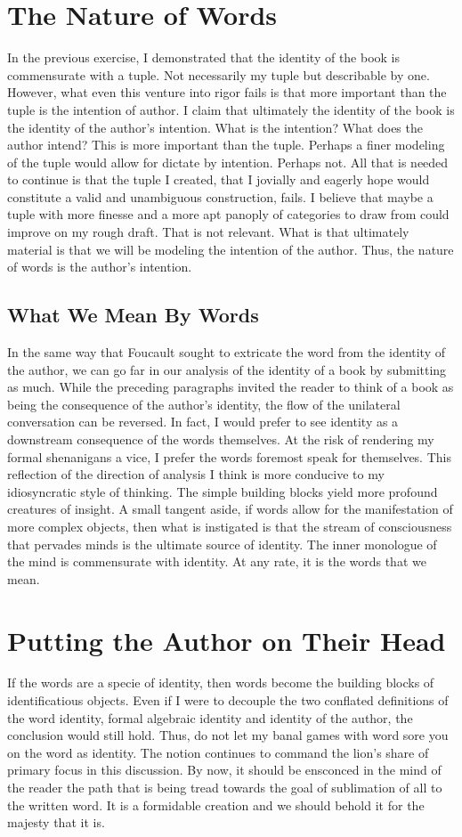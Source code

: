 \documentclass[12pt]{article}
\begin{document}
\section{The Nature of Words}
In the previous exercise, I demonstrated that the identity of the book is
commensurate with a tuple. Not necessarily my tuple but describable by one.
However, what even this venture into rigor fails is that more important than the
tuple is the intention of author. I claim that ultimately the identity of the
book is the identity of the author's intention. What is the intention? What does
the author intend? This is more important than the tuple. Perhaps a finer
modeling of the tuple would allow for dictate by intention. Perhaps not. All
that is needed to continue is that the tuple I created, that I jovially and
eagerly hope would constitute a valid and unambiguous construction, fails. I
believe that maybe a tuple with more finesse and a more apt panoply of
categories to draw from could improve on my rough draft. That is not relevant.
What is that ultimately material is that we will be modeling the intention of
the author. Thus, the nature of words is the author's intention.

\subsection{What We Mean By Words}
In the same way that Foucault sought to extricate the word from the identity of
the author, we can go far in our analysis of the identity of a book by
submitting as much. While the preceding paragraphs invited the reader to think
of a book as being the consequence of the author's identity, the flow of the
unilateral conversation can be reversed. In fact, I would prefer to see identity
as a downstream consequence of the words themselves. At the risk of rendering my
formal shenanigans a vice, I prefer the words foremost speak for themselves.
This reflection of the direction of analysis I think is more conducive to my
idiosyncratic style of thinking. The simple building blocks yield more profound
creatures of insight. A small tangent aside, if words allow for the
manifestation of more complex objects, then what is instigated is that the
stream of consciousness that pervades minds is the ultimate source of identity.
The inner monologue of the mind is commensurate with identity. At any rate, it is
the words that we mean.

\section{Putting the Author on Their Head}
If the words are a specie of identity, then words become the building blocks of
identificatious objects. Even if I were to decouple the two conflated
definitions of the word identity, formal algebraic identity and identity of the
author, the conclusion would still hold. Thus, do not let my banal games with
word sore you on the word as identity. The notion continues to command the
lion's share of primary focus in this discussion. By now, it should be ensconced
in the mind of the reader the path that is being tread towards the goal of
sublimation of all to the written word. It is a formidable creation and we
should behold it for the majesty that it is. 
\end{document}
